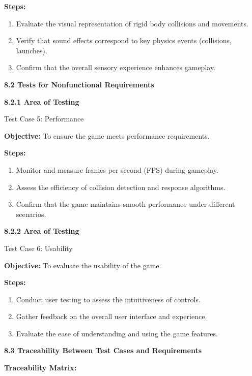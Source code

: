 \documentclass[
]{article}
\begin{document}
\textbf{Steps:}

\begin{enumerate}
\def\labelenumi{\arabic{enumi}.}
\item
  Evaluate the visual representation of rigid body collisions and
  movements.
\item
  Verify that sound effects correspond to key physics events
  (collisions, launches).
\item
  Confirm that the overall sensory experience enhances gameplay.
\end{enumerate}

\protect\hypertarget{Am4}{}{}\textbf{8.2 Tests for Nonfunctional
Requirements}

\textbf{8.2.1 Area of Testing}

Test Case 5: Performance

\textbf{Objective:} To ensure the game meets performance requirements.

\textbf{Steps:}

\begin{enumerate}
\def\labelenumi{\arabic{enumi}.}
\item
  Monitor and measure frames per second (FPS) during gameplay.
\item
  Assess the efficiency of collision detection and response algorithms.
\item
  Confirm that the game maintains smooth performance under different
  scenarios.
\end{enumerate}

\textbf{8.2.2 Area of Testing}

Test Case 6: Usability

\textbf{Objective:} To evaluate the usability of the game.

\textbf{Steps:}

\begin{enumerate}
\def\labelenumi{\arabic{enumi}.}
\item
  Conduct user testing to assess the intuitiveness of controls.
\item
  Gather feedback on the overall user interface and experience.
\item
  Evaluate the ease of understanding and using the game features.
\end{enumerate}

\protect\hypertarget{Am7}{}{}\textbf{8.3 Traceability Between Test Cases
and Requirements}

\textbf{Traceability Matrix:}
\end{document}
